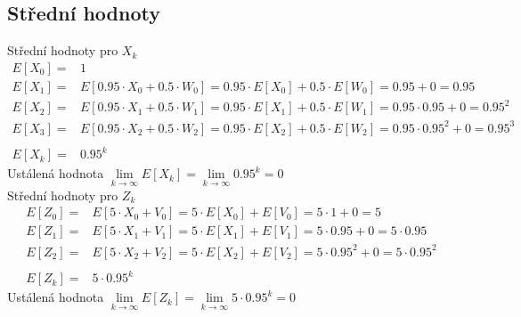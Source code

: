 \documentclass{article}
\begin{document}
		\subsection{Střední hodnoty}
			Střední hodnoty pro \(X_{k}\)
			\begin{align}
				E[X_{0}] =& 1\\
				E[X_{1}] =& E[0.95\cdot X_{0} + 0.5\cdot W_{0}] = 0.95\cdot E[X_{0}] + 0.5\cdot E[W_{0}] = 0.95 + 0 = 0.95\\
				E[X_{2}] =& E[0.95\cdot X_{1} + 0.5\cdot W_{1}] = 0.95\cdot E[X_{1}] + 0.5\cdot E[W_{1}] = 0.95\cdot 0.95 + 0 = 0.95^{2}\\
				E[X_{3}] =& E[0.95\cdot X_{2} + 0.5\cdot W_{2}] = 0.95\cdot E[X_{2}] + 0.5\cdot E[W_{2}] = 0.95\cdot 0.95^{2} + 0 = 0.95^{3}\\
				\\
				E[X_{k}] =& 0.95^{k}
			\end{align}
		Ustálená hodnota \(\lim\limits_{k\to\infty} E[X_{k}] = \lim\limits_{k\to\infty}0.95^{k}=0\)\\
		Střední hodnoty pro \(Z_{k}\)
			\begin{align}
				E[Z_{0}] =& E[5\cdot X_{0}+V_{0}] = 5\cdot E[X_{0}]+E[V_{0}]= 5\cdot 1 + 0 = 5\\
				E[Z_{1}] =& E[5\cdot X_{1}+V_{1}] = 5\cdot E[X_{1}]+E[V_{1}]= 5\cdot 0.95 + 0 = 5\cdot 0.95\\
				E[Z_{2}] =& E[5\cdot X_{2}+V_{2}] = 5\cdot E[X_{2}]+E[V_{2}]= 5\cdot 0.95^2 + 0 = 5\cdot 0.95^2\\
				\\
				E[Z_{k}] =& 5\cdot 0.95^{k}
			\end{align}
		Ustálená hodnota \(\lim\limits_{k\to\infty} E[Z_{k}] = \lim\limits_{k\to\infty}5\cdot 0.95^{k}=0\)\\
\end{document}
